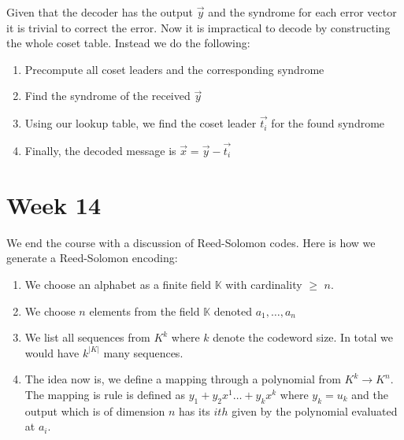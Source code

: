 \documentclass[titlepage]{article}
\begin{document}
Given that the decoder has the output $\vec{y}$ and the syndrome for each error vector it is trivial to correct the error. Now it is impractical to decode by constructing the whole coset table. Instead we do the following:

\begin{enumerate}
    \item Precompute all coset leaders and the corresponding syndrome
    \item Find the syndrome of the received $\vec{y}$
    \item Using our lookup table, we find the coset leader $\vec{t_{i}}$ for the found syndrome
    \item Finally, the decoded message is $\vec{x} = \vec{y} - \vec{t_{i}}$
\end{enumerate}
\section{Week 14}
We end the course with a discussion of Reed-Solomon codes. Here is how we generate a Reed-Solomon encoding:

\begin{enumerate}
    \item We choose an alphabet as a finite field $\mathbb{K}$ with cardinality $\geq$ $n$.
    \item We choose $n$ elements from the field $\mathbb{K}$ denoted $a_{1},\ldots,a_{n}$
    \item We list all sequences from $K^{k}$ where $k$ denote the codeword size. In total we would have $k^{|K|}$ many sequences. 
    \item The idea now is, we define a mapping through a polynomial from $K^{k} \to K^{n}$. The mapping is rule is defined as $y_{1} + y_{2}x^{1} \ldots + y_{k}x^{k}$ where $y_{k} = u_{k}$ and the output which is of dimension $n$ has its $ith$ given by the polynomial evaluated at $a_{i}$.
\end{enumerate}
\end{document}
